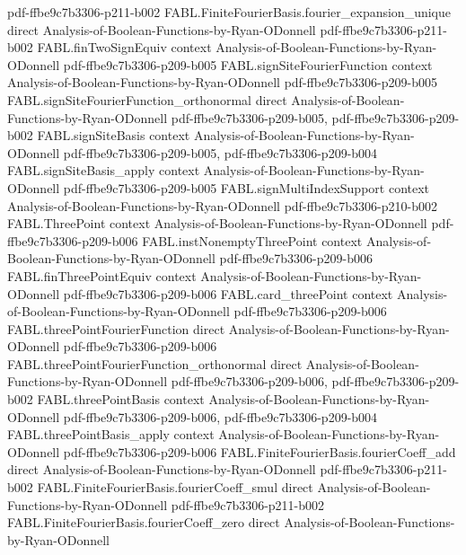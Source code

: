 \begin{theorem}
  {pdf-ffbe9c7b3306-p211-b002}
\proofstep
  {FABL.FiniteFourierBasis.fourier_expansion_unique}
  {direct}
  {Analysis-of-Boolean-Functions-by-Ryan-ODonnell}
  {pdf-ffbe9c7b3306-p211-b002}
\proofstep
  {FABL.finTwoSignEquiv}
  {context}
  {Analysis-of-Boolean-Functions-by-Ryan-ODonnell}
  {pdf-ffbe9c7b3306-p209-b005}
\proofstep
  {FABL.signSiteFourierFunction}
  {context}
  {Analysis-of-Boolean-Functions-by-Ryan-ODonnell}
  {pdf-ffbe9c7b3306-p209-b005}
\proofstep
  {FABL.signSiteFourierFunction_orthonormal}
  {direct}
  {Analysis-of-Boolean-Functions-by-Ryan-ODonnell}
  {pdf-ffbe9c7b3306-p209-b005,
    pdf-ffbe9c7b3306-p209-b002}
\proofstep
  {FABL.signSiteBasis}
  {context}
  {Analysis-of-Boolean-Functions-by-Ryan-ODonnell}
  {pdf-ffbe9c7b3306-p209-b005,
    pdf-ffbe9c7b3306-p209-b004}
\proofstep
  {FABL.signSiteBasis_apply}
  {context}
  {Analysis-of-Boolean-Functions-by-Ryan-ODonnell}
  {pdf-ffbe9c7b3306-p209-b005}
\proofstep
  {FABL.signMultiIndexSupport}
  {context}
  {Analysis-of-Boolean-Functions-by-Ryan-ODonnell}
  {pdf-ffbe9c7b3306-p210-b002}
\proofstep
  {FABL.ThreePoint}
  {context}
  {Analysis-of-Boolean-Functions-by-Ryan-ODonnell}
  {pdf-ffbe9c7b3306-p209-b006}
\proofstep
  {FABL.instNonemptyThreePoint}
  {context}
  {Analysis-of-Boolean-Functions-by-Ryan-ODonnell}
  {pdf-ffbe9c7b3306-p209-b006}
\proofstep
  {FABL.finThreePointEquiv}
  {context}
  {Analysis-of-Boolean-Functions-by-Ryan-ODonnell}
  {pdf-ffbe9c7b3306-p209-b006}
\proofstep
  {FABL.card_threePoint}
  {context}
  {Analysis-of-Boolean-Functions-by-Ryan-ODonnell}
  {pdf-ffbe9c7b3306-p209-b006}
\proofstep
  {FABL.threePointFourierFunction}
  {direct}
  {Analysis-of-Boolean-Functions-by-Ryan-ODonnell}
  {pdf-ffbe9c7b3306-p209-b006}
\proofstep
  {FABL.threePointFourierFunction_orthonormal}
  {direct}
  {Analysis-of-Boolean-Functions-by-Ryan-ODonnell}
  {pdf-ffbe9c7b3306-p209-b006,
    pdf-ffbe9c7b3306-p209-b002}
\proofstep
  {FABL.threePointBasis}
  {context}
  {Analysis-of-Boolean-Functions-by-Ryan-ODonnell}
  {pdf-ffbe9c7b3306-p209-b006,
    pdf-ffbe9c7b3306-p209-b004}
\proofstep
  {FABL.threePointBasis_apply}
  {context}
  {Analysis-of-Boolean-Functions-by-Ryan-ODonnell}
  {pdf-ffbe9c7b3306-p209-b006}
\proofstep
  {FABL.FiniteFourierBasis.fourierCoeff_add}
  {direct}
  {Analysis-of-Boolean-Functions-by-Ryan-ODonnell}
  {pdf-ffbe9c7b3306-p211-b002}
\proofstep
  {FABL.FiniteFourierBasis.fourierCoeff_smul}
  {direct}
  {Analysis-of-Boolean-Functions-by-Ryan-ODonnell}
  {pdf-ffbe9c7b3306-p211-b002}
\proofstep
  {FABL.FiniteFourierBasis.fourierCoeff_zero}
  {direct}
  {Analysis-of-Boolean-Functions-by-Ryan-ODonnell}

\end{theorem}
